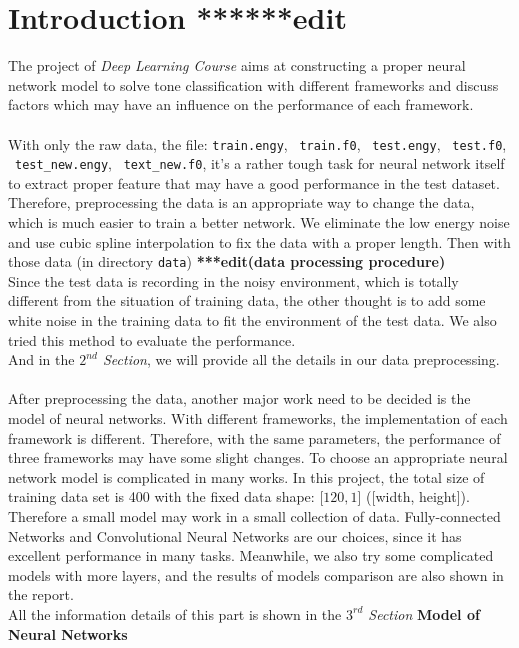 \documentclass[12pt]{article}
\begin{document}
\section{Introduction ******edit}

The project of {\it Deep Learning Course} aims at constructing a proper neural network model to solve tone classification with different frameworks and discuss factors which may have an influence on the performance of each framework.\\
\\
With only the raw data, the file: \texttt{train.engy}, \  \texttt{train.f0}, \ \texttt{test.engy}, \ \texttt{test.f0},  \ \texttt{test\_new.engy}, \ \texttt{text\_new.f0}, it's a rather tough task for neural network itself to extract proper feature that may have a good performance in the test dataset. Therefore, preprocessing the data  is an appropriate way to change the data, which is much easier to train a better network. We eliminate the low energy noise and use cubic spline interpolation to fix the data with a proper length. Then with those data (in directory \texttt{data}) {\bf ****edit(data processing procedure)}\\
Since the test data is recording in the noisy environment, which is totally different from the situation of training data, the other thought is to add some white noise in the training data to fit the environment of the test data. We also tried this method to evaluate the performance.\\
And in the {\it $2^{nd}$ Section}, we will provide all the details in our data preprocessing.\\
\\
After preprocessing the data, another major work need to be decided is the model of neural networks. With different frameworks, the implementation of each framework is different. Therefore, with the same parameters, the performance of three frameworks may have some slight changes. To choose an appropriate neural network model is complicated in many works. In this project, the total size of training data set is 400 with the fixed data shape: [$120, 1$] ([width, height]). Therefore a small model may work in a small collection of data. Fully-connected Networks and Convolutional Neural Networks are our choices, since it has excellent performance in many tasks. Meanwhile, we also try some complicated models with more layers, and the results of models comparison are also shown in the report.\\
All the information details of this part is shown in the {\it $3^{rd}$ Section} {\bf Model of Neural Networks}\\
\end{document}
